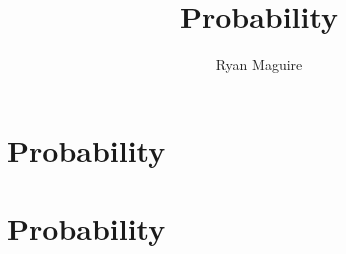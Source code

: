 \documentclass[crop=false,class=book,oneside]{standalone}
\begin{document}
\ifx\ifmath\undefined
    \title{Probability}
    \author{Ryan Maguire}
    \date{\vspace{-5ex}}
    \maketitle
    \tableofcontents
    \chapter*{Probability}
    \setcounter{chapter}{1}
\else
    \chapter{Probability}
\fi
\end{document}

